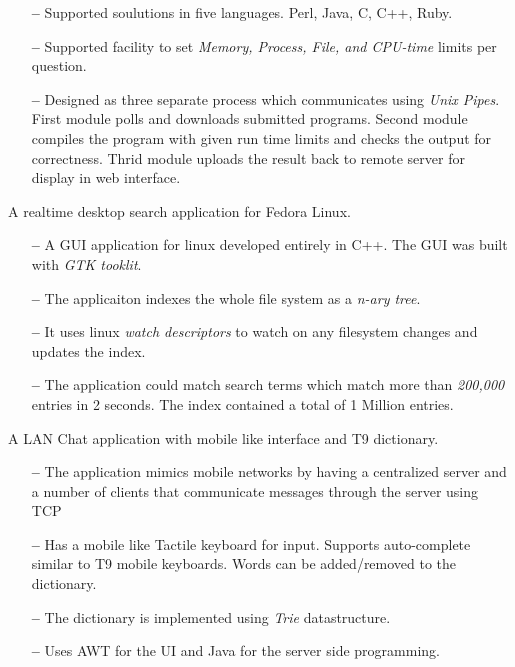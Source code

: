 \documentclass{cv}
\begin{document}
\begin{description}[leftmargin=50pt,labelwidth=50pt]
\begin{itemize}[label={},leftmargin=10pt,topsep=0pt]
      \item[\textbf{--}] Supported soulutions in five languages. Perl, Java, C, C++, Ruby.
      \item[\textbf{--}] Supported facility to set \textit{Memory, Process, File, and CPU-time} limits per question.
      \item[\textbf{--}] Designed as three separate process which communicates using \textit{Unix Pipes}.  First module polls and downloads submitted programs.  Second module compiles the program with given run time limits and checks the output for correctness.  Thrid module uploads the result back to remote server for display in web interface.
    \end{itemize}
  \item[Desktop Search] A realtime desktop search application for Fedora Linux.
    \begin{itemize}[label={},leftmargin=10pt,topsep=0pt]
      \item[\textbf{--}] A GUI application for linux developed entirely in C++.  The GUI was built with \textit{GTK tooklit}.
      \item[\textbf{--}] The applicaiton indexes the whole file system as a \textit{n-ary tree}.
      \item[\textbf{--}] It uses linux \textit{watch descriptors} to watch on any filesystem changes and updates the index.
      \item[\textbf{--}] The application could match search terms which match more than \textit{200,000} entries in 2 seconds.  The index contained a total of 1 Million entries.
    \end{itemize}
  \item[SMS Simulator] A LAN Chat application with mobile like interface and T9 dictionary.
    \begin{itemize}[label={},leftmargin=10pt,topsep=0pt]
      \item[\textbf{--}] The application mimics mobile networks by having a centralized server and a number of clients that communicate messages through the server using TCP\@
      \item[\textbf{--}] Has a mobile like Tactile keyboard for input.  Supports auto-complete similar to T9 mobile keyboards.  Words can be added/removed to the dictionary.
      \item[\textbf{--}] The dictionary is implemented using \textit{Trie} datastructure.
      \item[\textbf{--}] Uses AWT for the UI and Java for the server side programming.
    \end{itemize}
\end{description}
\end{document}
